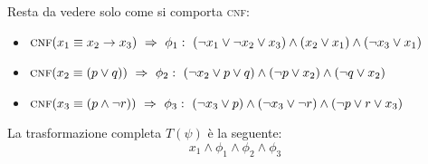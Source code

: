 Resta da vedere solo come si comporta \textsc{cnf}:
\begin{itemize}
    \item $\textsc{cnf}(x_1 \equiv x_2 \rightarrow x_3) \ \Rightarrow \ \phi_1 : \  (\neg x_1 \lor \neg x_2 \lor x_3) \land (x_2 \lor x_1) \land  (\neg x_3 \lor x_1) $
    \item $\textsc{cnf}(x_2 \equiv (p \vee q)) \ \Rightarrow \ \phi_2 : \  (\neg x_2 \lor p \lor q) \land (\neg p \lor x_2) \land (\neg q \lor x_2) $
    \item $\textsc{cnf}(x_3 \equiv (p \wedge \neg r)) \ \Rightarrow \ \phi_3 : \ (\neg x_3 \lor p) \land (\neg x_3 \lor \neg r) \land  (\neg p \lor r \lor x_3)$
    
\end{itemize}
La trasformazione completa $T(\psi)$ è la seguente:
\[  \boxed{x_1 \wedge \phi_1 \wedge \phi_2 \wedge \phi_3   }    \]


\newpage
